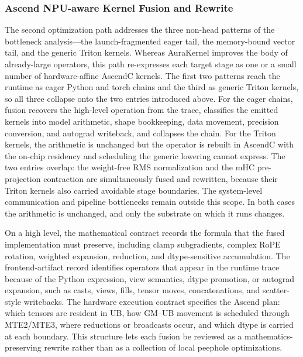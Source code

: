 \subsubsection{Ascend NPU-aware Kernel Fusion and Rewrite}
\label{sec:kernel_fusion}
The second optimization path addresses the three non-head patterns of the bottleneck analysis---the launch-fragmented eager tail, the memory-bound vector tail, and the generic Triton kernels. Whereas AuraKernel improves the body of already-large operators, this path re-expresses each target stage as one or a small number of hardware-affine AscendC kernels. The first two patterns reach the runtime as eager Python and torch chains and the third as generic Triton kernels, so all three collapse onto the two entries introduced above. For the eager chains, fusion recovers the high-level operation from the trace, classifies the emitted kernels into model arithmetic, shape bookkeeping, data movement, precision conversion, and autograd writeback, and collapses the chain. For the Triton kernels, the arithmetic is unchanged but the operator is rebuilt in AscendC with the on-chip residency and scheduling the generic lowering cannot express. The two entries overlap: the weight-free RMS normalization and the mHC pre-projection contraction are simultaneously fused and rewritten, because their Triton kernels also carried avoidable stage boundaries. The system-level communication and pipeline bottlenecks remain outside this scope. In both cases the arithmetic is unchanged, and only the substrate on which it runs changes.

On a high level, the mathematical contract records the formula that the fused implementation must preserve, including clamp subgradients, complex RoPE rotation, weighted expansion, reduction, and dtype-sensitive accumulation. The frontend-artifact record identifies operators that appear in the runtime trace because of the Python expression, view semantics, dtype promotion, or autograd expansion, such as casts, views, fills, tensor moves, concatenations, and scatter-style writebacks. The hardware execution contract specifies the Ascend plan: which tensors are resident in UB, how GM--UB movement is scheduled through MTE2/MTE3, where reductions or broadcasts occur, and which dtype is carried at each boundary. This structure lets each fusion be reviewed as a mathematics-preserving rewrite rather than as a collection of local peephole optimizations.

